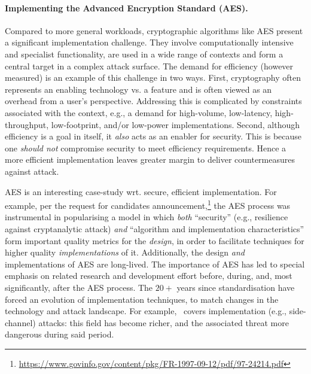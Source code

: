 
\paragraph{Implementing the Advanced Encryption Standard (AES).}

%
%

Compared to more general workloads, cryptographic algorithms like AES
present a significant implementation challenge.
They involve computationally intensive and specialist functionality,
are used in a wide range of contexts
and
form a central target in a complex attack surface.
The demand for efficiency (however measured) is an example of this
challenge in two ways.
First,
cryptography often represents an enabling technology vs. a feature and
is often viewed as an overhead from a user's perspective.
Addressing this is
complicated by constraints associated with the context, e.g., a demand 
for
high-volume, 
 low-latency, 
high-throughput, 
 low-footprint, 
and/or 
 low-power
 implementations.
Second,
although efficiency is a goal in itself, it {\em also} 
acts as an enabler for security.
This is because one {\em should not}
compromise security to meet efficiency requirements.
Hence a more efficient implementation leaves greater margin to deliver
countermeasures against attack.

AES is an interesting case-study wrt. secure, efficient implementation.
For example,
per the request for candidates announcement,\footnote{%
\url{https://www.govinfo.gov/content/pkg/FR-1997-09-12/pdf/97-24214.pdf}
} the AES process was instrumental in popularising a model in which
{\em both}
``security''
(e.g., resilience against cryptanalytic attack)
{\em and}
``algorithm and implementation characteristics''
form important quality metrics for the {\em design}, in order to facilitate
techniques for higher quality {\em implementations} of it.
Additionally,
the design {\em and} implementations of AES are long-lived.
The importance of AES has led to special emphasis on related
research and development effort before, during, and, most significantly, 
after the AES process.
The $20+$ years since standardisation have forced an evolution of 
implementation techniques, to match changes in the technology 
and attack landscape.  For example,~\cite[Section 3.6]{NBBBDFR:01} covers
implementation (e.g., side-channel) attacks: this field has become richer,
and the associated threat more dangerous during said period.

